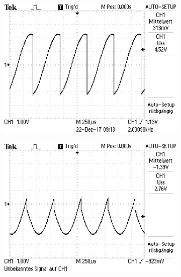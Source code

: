 \begin{figure}[H]
\begin{subfigure}{0.48\textwidth}
\end{subfigure}
\begin{subfigure}{0.48\textwidth}
	\includegraphics[width=\textwidth]{90Grad.JPG}
\end{subfigure}
\begin{subfigure}{0.48\textwidth}
  \includegraphics[width=\textwidth]{180Grad.JPG}
\end{subfigure}
\begin{subfigure}{0.48\textwidth}

\end{subfigure}
\end{figure}
